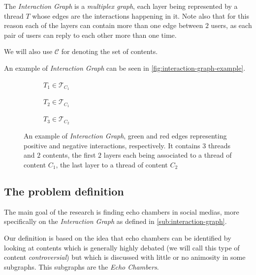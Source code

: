 The \emph{Interaction Graph} is a \emph{multiplex graph}, each layer being
represented by a thread $T$ whose edges are the interactions happening in it.
Note also that for this reason each of the layers can contain more than one
edge between $2$ users, as each pair of users can reply to each other more than
one time.

We will also use $\mathcal{C} $ for denoting the set of contents.

An example of \emph{Interaction Graph} can be seen in
\autoref{fig:interaction-graph-example}.

\begin{figure}
	\begin{center}
		\begin{subfigure}[b]{0.3\textwidth}
			\centering
			\caption{$T_{1} \in \mathcal{T}_{C_{1}} $}
			\label{fig:tex/tikz/graph_thread1.tikz}
		\end{subfigure}
		\begin{subfigure}[b]{0.3\textwidth}
			\centering
			\caption{$T_{2} \in \mathcal{T}_{C_{1}} $}
			\label{fig:tex/tikz/graph_thread2.tikz}
		\end{subfigure}
		\begin{subfigure}[b]{0.3\textwidth}
			\centering
			\caption{$T_{3} \in \mathcal{T}_{C_{2}} $}
			\label{fig:tex/tikz/graph_thread3.tikz}
		\end{subfigure}
	\end{center}
	\caption[Example \emph{Interaction Graph}]{An example of \emph{Interaction Graph}, green and red edges
		representing positive and negative interactions, respectively. It
		contains $3$ threads and $2$ contents, the first $2$ layers each being
		associated to a thread of content $C_{1} $, the last layer to a thread
		of content $C_{2} $}
	\label{fig:interaction-graph-example}
\end{figure}

\subsection{The problem definition}%
\label{sub:the_problem_definition}

The main goal of the research is finding echo chambers in social medias, more
specifically on the \emph{Interaction Graph} as defined in
\autoref{sub:interaction-graph}.

Our definition is based on the idea that echo chambers can be identified by
looking at contents which is generally highly debated (we will call
this type of content \emph{controversial}) but which is discussed with little
or no animosity in some subgraphs. This subgraphs are the \emph{Echo
	Chambers}.

